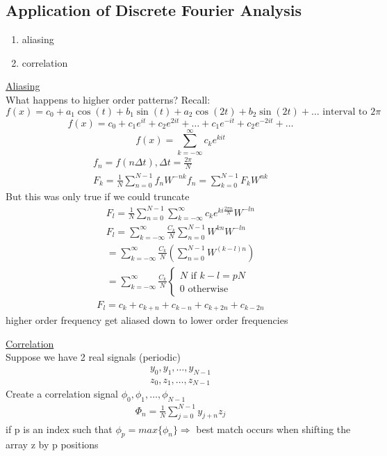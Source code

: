 \documentclass[10pt,usletter]{article}
\begin{document}
\subsection{Application of Discrete Fourier Analysis}
\begin{enumerate}
\item aliasing
\item correlation
\end{enumerate}
\underline{Aliasing}\\
What happens to higher order patterns?
Recall:
$$f(x) = c_0+a_1\cos(t)+b_1\sin(t)+a_2\cos(2t)+b_2\sin(2t)+\hdots\text{ interval to }2\pi$$
$$f(x) = c_0+c_1e^{it}+c_2e^{2it}+\hdots+c_1e^{-it}+c_2e^{-2it}+\hdots$$
$$f(x)=\sum_{k=-\infty}^{\infty}c_ke^{kit}$$
\begin{align*}
f_n=f(n\Delta t),\Delta	t = \frac{2\pi}{N}\\
F_k=\frac{1}{N}\sum_{n=0}^{N-1}f_nW^{-nk}
f_n=\sum_{k=0}^{N-1}F_kW^{nk}
\end{align*}
But this was only true if we could truncate
\begin{align*}
F_l=\frac{1}{N}\sum_{n=0}^{N-1}\sum_{k=-\infty}^{\infty}c_ke^{ki\frac{2\pi n}{N}}W^{-ln}\\
F_l=\sum_{k=-\infty}^{\infty}\frac{C_k}{N}\sum_{n=0}^{N-1}W^{kn}W^{-ln}\\
=\sum_{k=-\infty}^{\infty}\frac{C_k}{N}\left(\sum_{n=0}^{N-1}W^{(k-l)n}\right)\\
=\sum_{k=-\infty}^{\infty}\frac{C_k}{N}\begin{cases}
N\text{ if }k-l=pN\\
0 \text{ otherwise}
\end{cases}
\end{align*}
\begin{align*}
F_l=c_k+c_{k+n}+c_{k-n}+c_{k+2n}+c_{k-2n}
\end{align*}
higher order frequency get aliased down to lower order frequencies

\underline{Correlation}\\
Suppose we have 2 real signals (periodic)
\begin{align*}
y_0,y_1,\hdots,y_{N-1}\\
z_0,z_1,\hdots,z_{N-1}
\end{align*}
Create a correlation signal $\phi_0,\phi_1,\hdots,\phi_{N-1}$
\begin{align*}
\Phi_n=\frac{1}{N}\sum_{j=0}^{N-1}y_{j+n}z_j
\end{align*}
if p is an index such that $\phi_p=max\{\phi_n\}\Rightarrow$ best match occurs when shifting the array z by p positions
\end{document}
